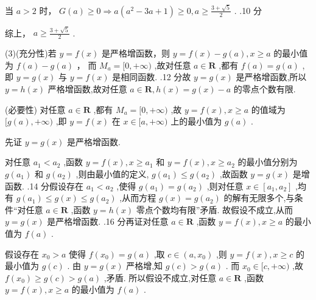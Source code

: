 \documentclass[10pt]{article}
\begin{document}
当 \(a > 2\) 时， \(G\left( a\right)  \geq  0 \Rightarrow  a\left( {{a}^{2} - {3a} + 1}\right)  \geq  0,a \geq  \frac{3 + \sqrt{5}}{2}\) . .10 分

综上， \(a \geq  \frac{3 + \sqrt{5}}{2}\) .

(3)(充分性)若 \(y = f\left( x\right)\) 是严格增函数，则 \(y = f\left( x\right)  - g\left( a\right) ,x \geq  a\) 的最小值为 \(f\left( a\right)  - g\left( a\right)\) ， 而 \({M}_{a} = \lbrack 0, + \infty )\) ,故对任意 \(a \in  \mathbf{R}\) ,都有 \(f\left( a\right)  = g\left( a\right)\) ,即 \(y = g\left( x\right)\) 与 \(y = f\left( x\right)\) 是相同函数. .12 分故 \(y = g\left( x\right)\) 是严格增函数,所以 \(y = h\left( x\right)\) 严格增函数,故对任意 \(a \in  \mathbf{R},h\left( x\right)  = g\left( x\right)  - a\) 的零点个数有限.

(必要性) 对任意 \(a \in  \mathbf{R}\) ,都有 \({M}_{a} = \lbrack 0, + \infty )\) ,故 \(y = f\left( x\right) ,x \geq  a\) 的值域为 \(\lbrack g\left( a\right) , + \infty )\) ,即 \(y = f\left( x\right)\) 在 \(x \in  \lbrack a, + \infty )\) 上的最小值为 \(g\left( a\right)\) .

先证 \(y = g\left( x\right)\) 是严格增函数.

对任意 \({a}_{1} < {a}_{2}\) ,函数 \(y = f\left( x\right) ,x \geq  {a}_{1}\) 和 \(y = f\left( x\right) ,x \geq  {a}_{2}\) 的最小值分别为 \(g\left( {a}_{1}\right)\) 和 \(g\left( {a}_{2}\right)\) ,则由最小值的定义, \(g\left( {a}_{1}\right)  \leq  g\left( {a}_{2}\right)\) ,故函数 \(y = g\left( x\right)\) 是增函数. .14 分假设存在 \({a}_{1} < {a}_{2}\) ,使得 \(g\left( {a}_{1}\right)  = g\left( {a}_{2}\right)\) ,则对任意 \(x \in  \left\lbrack  {{a}_{1},{a}_{2}}\right\rbrack\) ,均有 \(g\left( {a}_{1}\right)  \leq  g\left( x\right)  \leq  g\left( {a}_{2}\right)\) ,从而方程 \(g\left( x\right)  = g\left( {a}_{2}\right)\) 的解有无限多个,与条件“对任意 \(a \in  \mathbf{R}\) ,函数 \(y = h\left( x\right)\) 零点个数均有限”矛盾. 故假设不成立,从而 \(y = g\left( x\right)\) 是严格增函数. .16 分再证对任意 \(a \in  \mathbf{R}\) ,函数 \(y = f\left( x\right) ,x \geq  a\) 的最小值为 \(f\left( a\right)\) .

假设存在 \({x}_{0} > a\) 使得 \(f\left( {x}_{0}\right)  = g\left( a\right)\) ,取 \(c \in  \left( {a,{x}_{0}}\right)\) ,则 \(y = f\left( x\right) ,x \geq  c\) 的最小值为 \(g\left( c\right)\) . 由 \(y = g\left( x\right)\) 严格增,知 \(g\left( c\right)  > g\left( a\right)\) . 而 \({x}_{0} \in  \lbrack c, + \infty )\) ,故 \(f\left( {x}_{0}\right)  \geq  g\left( c\right)  > g\left( a\right)\) ,矛盾. 所以假设不成立,对任意 \(a \in  \mathbf{R}\) ,函数 \(y = f\left( x\right) ,x \geq  a\) 的最小值为 \(f\left( a\right)\) .
\end{document}
